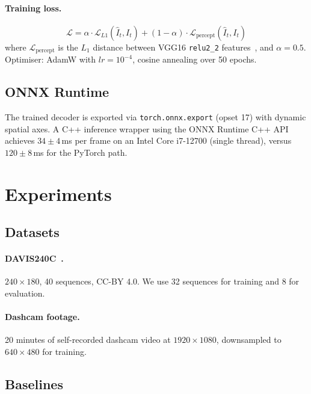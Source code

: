 \documentclass[10pt,twocolumn,letterpaper]{article}
\begin{document}
\paragraph{Training loss.}
\begin{equation}
  \mathcal{L} = \alpha \cdot \mathcal{L}_{L1}(\hat{I}_t, I_t)
              + (1-\alpha) \cdot \mathcal{L}_{\text{percept}}(\hat{I}_t, I_t)
\end{equation}
where $\mathcal{L}_{\text{percept}}$ is the $L_1$ distance between
VGG16 \texttt{relu2\_2} features~\cite{simonyan2014vgg}, and $\alpha = 0.5$.
Optimiser: AdamW with $lr = 10^{-4}$, cosine annealing over 50 epochs.

\subsection{ONNX Runtime}
\label{sec:method:rt}

The trained decoder is exported via \texttt{torch.onnx.export} (opset 17)
with dynamic spatial axes.
A C++ inference wrapper using the ONNX Runtime C++ API achieves
$34 \pm 4$\,ms per frame on an Intel Core i7-12700 (single thread),
versus $120 \pm 8$\,ms for the PyTorch path.

\section{Experiments}
\label{sec:experiments}

\subsection{Datasets}

\paragraph{DAVIS240C~\cite{brandli2014240}.}
$240 \times 180$, 40 sequences, CC-BY 4.0.
We use 32 sequences for training and 8 for evaluation.

\paragraph{Dashcam footage.}
20 minutes of self-recorded dashcam video at $1920 \times 1080$, downsampled
to $640 \times 480$ for training.

\subsection{Baselines}
\end{document}

